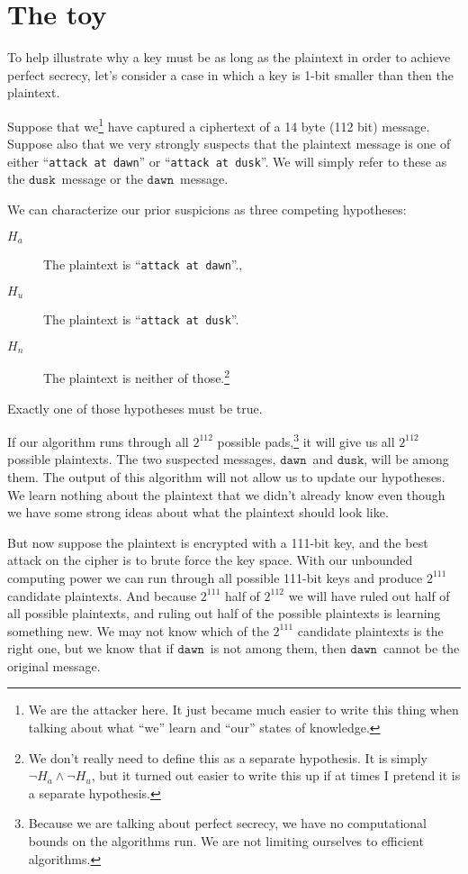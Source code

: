 \documentclass[11pt]{article}
\newcommand\mdusk{\ensuremath{\mathtt{dusk}}}
\newcommand\mdawn{\ensuremath{\mathtt{dawn}}}
\begin{document}
\section{The toy}

To help illustrate why a key must be as long as the plaintext in order to achieve perfect secrecy, let's consider a case in which a key is 1-bit smaller than then the plaintext.

Suppose that we\footnote{%
    We are the attacker here. It just became much easier to write this thing when talking about what \enquote{we} learn and \enquote{our} states of knowledge.
}
have captured a ciphertext of a 14 byte (112 bit) message.
Suppose also that we very strongly suspects that the plaintext message is one of either “\texttt{attack at dawn}” or “\texttt{attack at dusk}”.
We will simply refer to these as the \mdusk\ message or the \mdawn\ message.

We can characterize our prior suspicions as three competing hypotheses:

\begin{description}
    \item[$H_a$] The plaintext is “\texttt{attack at dawn}”.,
    \item[$H_u$] The plaintext is “\texttt{attack at dusk}”.
    \item[$H_n$] The plaintext is neither of those.\footnote{%
        We don't really need to define this as a separate hypothesis. It is simply $\neg H_a \land \neg H_u$, but it turned out easier to write this up if at times I pretend it is a separate hypothesis.}
\end{description}
Exactly one of those hypotheses must be true.

If our algorithm runs through all $2^{112}$ possible pads,\footnote{%
    Because we are talking about perfect secrecy,
    we have no computational bounds on the algorithms run.
    We are not limiting ourselves to efficient algorithms.}
it will give us all $2^{112}$ possible plaintexts.
The two suspected messages, \mdawn\ and \mdusk, will be among them.
The output of this algorithm will not allow us to update our hypotheses.
We learn nothing about the plaintext that we didn't already know even though we have some strong ideas about what the plaintext should look like.

But now suppose the plaintext is encrypted with a 111-bit key, and the best attack on the cipher is to brute force the key space.
With our unbounded computing power we can run through all possible 111-bit keys and produce $2^{111}$ candidate plaintexts.
And because $2^{111}$ half of $2^{112}$
we will have ruled out half of all possible plaintexts,
and ruling out half of the possible plaintexts is learning something new.
We may not know which of the $2^{111}$ candidate plaintexts is the right one, but we know that if \mdawn\ is not among them, then \mdawn\ cannot be the original message.
\end{document}
